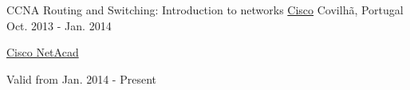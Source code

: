 \begin{cventries}
  \cventry
    {CCNA Routing and Switching: Introduction to networks} %
    {\href{https://www.cisco.com/}{Cisco}} %
    {Covilh\~a, Portugal} %
    {Oct. 2013 - Jan. 2014} %
    {
	    \begin{cvitems} %
        \item {\href{https://www.netacad.com/}{Cisco NetAcad}} %
        \item {Valid from Jan. 2014 - Present} %
      \end{cvitems}
    }

\end{cventries}